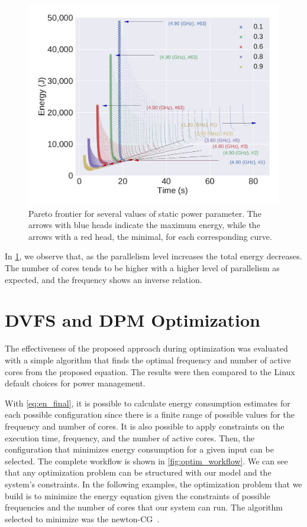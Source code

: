 \begin{figure}[H]
	\includegraphics[width=\columnwidth]{models/figures/analisys/pareto_w_high.pdf}
	\caption{Pareto frontier for several values of static power parameter. The arrows with blue heads indicate the maximum energy, while the arrows with a red head, the minimal, for each corresponding curve.}%
	\label{fig:pareto_w}
\end{figure}

In  \cref{fig:pareto_w}, we observe that, as the parallelism level increases the total energy decreases. The number of cores tends to be higher with a higher level of parallelism as expected, and the frequency shows an inverse relation.


\section{DVFS and DPM Optimization} \label{subsec:dvfs_optmin}
The effectiveness of the proposed approach during optimization was evaluated with a simple algorithm that finds the optimal frequency and number of active cores from the proposed equation. The results were then compared to the Linux default choices for power management.

With \cref{eq:en_final}, it is possible to calculate energy consumption estimates for each possible configuration since there is a finite range of possible values for the frequency and number of cores. It is also possible to apply constraints on the execution time, frequency, and the number of active cores. Then, the configuration that minimizes energy consumption for a given input can be selected. The complete workflow is shown in \cref{fig:optim_workflow}. We can see that any optimization problem can be structured with our model and the system's constraints. In the following examples, the optimization problem that we build is to minimize the energy equation given the constraints of possible frequencies and the number of cores that our system can run. The algorithm selected to minimize was the newton-CG~\cite{Royer2020AOptimization}.

